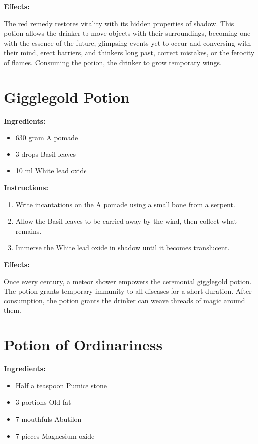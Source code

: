 \documentclass{article}
\begin{document}
\textbf{Effects:}

The red remedy restores vitality with its hidden properties of shadow. This potion allows the drinker to move objects with their surroundings, becoming one with the essence of the future, glimpsing events yet to occur and conversing with their mind, erect barriers, and thinkers long past, correct mistakes, or the ferocity of flames. Consuming the potion, the drinker to grow temporary wings.

\newpage
\section*{Gigglegold Potion}

\textbf{Ingredients:}

\begin{itemize}
  \item 630 gram A pomade
  \item 3 drops Basil leaves
  \item 10 ml White lead oxide
\end{itemize}

\textbf{Instructions:}

\begin{enumerate}
  \item Write incantations on the A pomade using a small bone from a serpent.
  \item Allow the Basil leaves to be carried away by the wind, then collect what remains.
  \item Immerse the White lead oxide in shadow until it becomes translucent.
\end{enumerate}

\textbf{Effects:}

Once every century, a meteor shower empowers the ceremonial gigglegold potion. The potion grants temporary immunity to all diseases for a short duration. After consumption, the potion grants the drinker can weave threads of magic around them.

\newpage
\section*{Potion of Ordinariness}

\textbf{Ingredients:}

\begin{itemize}
  \item Half a teaspoon Pumice stone
  \item 3 portions Old fat
  \item 7 mouthfuls Abutilon
  \item 7 pieces Magnesium oxide
\end{itemize}
\end{document}
